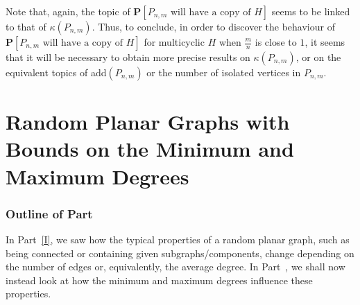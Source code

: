 \documentclass{article}
\newtheorem{Proof of Theorem}{Proof of Theorem}
\begin{document}
Note that, again,
the topic of
$\mathbf{P}[P_{n,m} \textrm{ will have a copy of }H]$
seems to be linked to that of $\kappa(P_{n,m})$.
Thus, to conclude,
in order to discover the behaviour of
$\mathbf{P}[P_{n,m} \textrm{ will have a copy of }H]$
for multicyclic $H$ when $\frac{m}{n}$ is close to $1$,
it seems that it will be necessary to obtain more precise results on $\kappa(P_{n,m})$,
or on the equivalent topics of add$(P_{n,m})$ 
or the number of isolated vertices in $P_{n,m}$.













































\newpage
\part[Random Planar Graphs with Bounds on the Minimum~and Maximum Degrees]
{Random Planar Graphs with Bounds on the Minimum and Maximum Degrees} 
\label{II}
\section{Outline of Part~\ref{II}} \label{bintro}















In Part~\ref{I}, we saw how the typical properties of a random planar graph,
such as being connected or containing given subgraphs/components,
change depending on the number of edges or, equivalently, the average degree.
In Part~\ref{II}, we shall now instead look at how the minimum and maximum degrees influence these properties.
\end{document}
